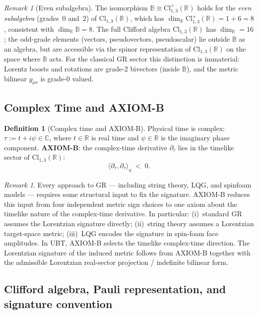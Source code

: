 \documentclass[12pt,a4paper]{article}
\theoremstyle{definition}
\newtheorem{definition}[theorem]{Definition}
\theoremstyle{remark}
\newtheorem{remark}[theorem]{Remark}
\newcommand{\BB}{\mathbb{B}}
\newcommand{\CC}{\mathbb{C}}
\newcommand{\RR}{\mathbb{R}}
\begin{document}
\begin{remark}[Even subalgebra]
\label{rem:even}
The isomorphism $\BB \cong \mathrm{Cl}^+_{1,3}(\RR)$ holds for the
\emph{even subalgebra} (grades~0 and~2) of $\mathrm{Cl}_{1,3}(\RR)$,
which has $\dim_\RR \mathrm{Cl}^+_{1,3}(\RR) = 1 + 6 = 8$,
consistent with $\dim_\RR \BB = 8$.
The full Clifford algebra $\mathrm{Cl}_{1,3}(\RR)$ has $\dim_\RR = 16$;
the odd-grade elements (vectors, pseudovectors, pseudoscalar)
lie outside $\BB$ as an algebra, but are accessible via the spinor
representation of $\mathrm{Cl}_{1,3}(\RR)$ on the space where $\BB$ acts.
For the classical GR sector this distinction is immaterial:
Lorentz boosts and rotations are grade-2 bivectors (inside $\BB$),
and the metric bilinear $g_{\mu\nu}$ is grade-0 valued.
\end{remark}

\subsection{Complex Time and AXIOM-B}

\begin{definition}[Complex time and AXIOM-B]
\label{def:axiomb}
Physical time is complex: $\tau := t + i\psi \in \CC$,
where $t \in \RR$ is real time and $\psi \in \RR$ is the imaginary phase component.
\textbf{AXIOM-B}: the complex-time derivative $\partial_\tau$ lies in the
timelike sector of $\mathrm{Cl}_{1,3}(\RR)$:
\[
  \langle\partial_\tau,\partial_\tau\rangle_\eta \;<\; 0.
\]
\end{definition}

\begin{remark}
Every approach to GR — including string theory, LQG, and spinfoam models —
requires some structural input to fix the signature.
AXIOM-B reduces this input from four independent metric sign choices to one
axiom about the timelike nature of the complex-time derivative.
In particular:
(i)~standard GR assumes the Lorentzian signature directly;
(ii)~string theory assumes a Lorentzian target-space metric;
(iii)~LQG encodes the signature in spin-foam face amplitudes.
In UBT, AXIOM-B selects the timelike complex-time direction.
The Lorentzian signature of the induced metric follows from AXIOM-B together
with the admissible Lorentzian real-sector projection / indefinite bilinear form.
\end{remark}

\subsection{Clifford algebra, Pauli representation, and signature convention}
\end{document}
